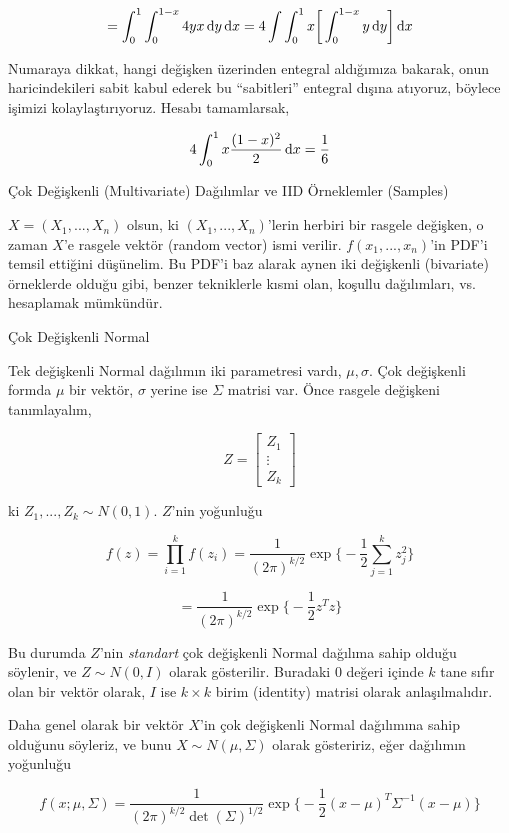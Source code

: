 \documentclass[12pt,fleqn]{article}\usepackage{../../common}
\begin{document}
$$ =
\int _{ 0}^{1} \int _{ 0}^{1-x} 4yx \,\mathrm{d} y \,\mathrm{d} x = 
4 \int \int _{ 0}^{1} x \bigg[ \int _{ 0}^{1-x} y \,\mathrm{d} y \bigg] \,\mathrm{d} x
$$

Numaraya dikkat, hangi değişken üzerinden entegral aldığımıza bakarak, onun
haricindekileri sabit kabul ederek bu ``sabitleri'' entegral dışına
atıyoruz, böylece işimizi kolaylaştırıyoruz. Hesabı tamamlarsak, 

$$
4 \int _{ 0}^{1} x \frac{ (1- x)^2}{2} \,\mathrm{d} x = \frac{1}{6}
$$

Çok Değişkenli (Multivariate) Dağılımlar ve IID Örneklemler (Samples)

$X = (X_1,...,X_n)$ olsun, ki $(X_1,...,X_n)$'lerin herbiri bir rasgele
değişken, o zaman $X$'e rasgele vektör (random vector) ismi
verilir. $f(x_1,...,x_n)$'in PDF'i temsil ettiğini düşünelim. Bu PDF'i baz
alarak aynen iki değişkenli (bivariate) örneklerde olduğu gibi, benzer
tekniklerle kısmi olan, koşullu dağılımları, vs. hesaplamak mümkündür.

Çok Değişkenli Normal 

Tek değişkenli Normal dağılımın iki parametresi vardı, $\mu,\sigma$. Çok
değişkenli formda $\mu$ bir vektör, $\sigma$ yerine ise $\Sigma$ matrisi
var. Önce rasgele değişkeni tanımlayalım,

$$ Z = 
\left[\begin{array}{r} Z_1 \\ \vdots \\ Z_k \end{array}\right]
$$

ki $Z_1,...,Z_k \sim N(0,1)$. $Z$'nin yoğunluğu 

$$ f(z) = \prod _{ i=1}^{k}f(z_i) = 
\frac{ 1}{(2\pi)^{k/2}} \exp 
\bigg\{  -\frac{ 1}{2}\sum _{ j=1}^{k}z_j^2 \bigg\}
$$

$$ =
\frac{ 1}{(2\pi)^{k/2}} \exp 
\bigg\{  -\frac{ 1}{2}z^Tz \bigg\}
$$

Bu durumda $Z$'nin {\em standart} çok değişkenli Normal dağılıma sahip olduğu
söylenir, ve $Z \sim N(0,I)$ olarak gösterilir. Buradaki $0$ değeri içinde $k$
tane sıfır olan bir vektör olarak, $I$ ise $k \times k$ birim (identity) matrisi
olarak anlaşılmalıdır.

Daha genel olarak bir vektör $X$'in çok değişkenli Normal dağılımına sahip
olduğunu söyleriz, ve bunu $X \sim N(\mu,\Sigma)$ olarak gösteririz, eğer
dağılımın yoğunluğu

$$
f(x;\mu,\Sigma) = 
\frac{ 1}{(2\pi)^{k/2} \det(\Sigma)^{1/2}} \exp 
\bigg\{ 
-\frac{ 1}{2}(x-\mu)^T\Sigma^{-1}(x-\mu)
\bigg\}
$$
\end{document}
